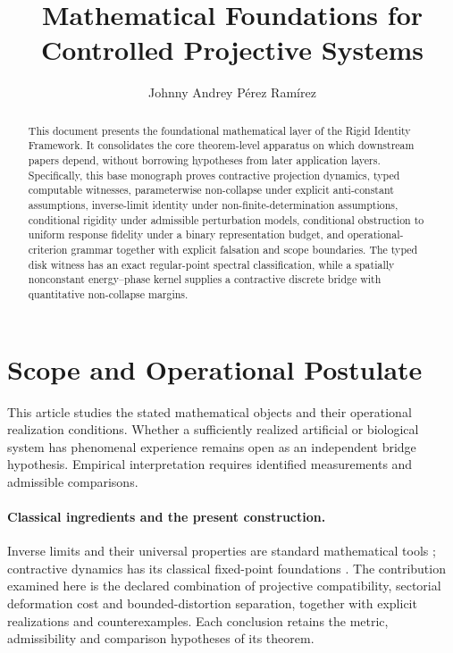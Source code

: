 \documentclass[11pt,a4paper]{article}
\title{\textbf{Mathematical Foundations for Controlled Projective Systems}}
\author{Johnny Andrey P\'{e}rez Ram\'{i}rez}
\date{}
\theoremstyle{plain}
\theoremstyle{definition}
\theoremstyle{remark}
\begin{document}
\setlength{\emergencystretch}{3em}
\maketitle

\begin{abstract}
This document presents the foundational mathematical layer of the Rigid Identity Framework. It consolidates the core theorem-level apparatus on which downstream papers depend, without borrowing hypotheses from later application layers. Specifically, this base monograph proves contractive projection dynamics, typed computable witnesses, parameterwise non-collapse under explicit anti-constant assumptions, inverse-limit identity under non-finite-determination assumptions, conditional rigidity under admissible perturbation models, conditional obstruction to uniform response fidelity under a binary representation budget, and operational-criterion grammar together with explicit falsation and scope boundaries. The typed disk witness has an exact regular-point spectral classification, while a spatially nonconstant energy--phase kernel supplies a contractive discrete bridge with quantitative non-collapse margins.
\end{abstract}

\section*{Scope and Operational Postulate}
This article studies the stated mathematical objects and their operational
realization conditions. Whether a sufficiently realized artificial or biological
system has phenomenal experience remains open as an independent bridge
hypothesis. Empirical interpretation requires identified measurements and
admissible comparisons.


\tableofcontents
\newpage

\paragraph{Classical ingredients and the present construction.}
Inverse limits and their universal properties are standard mathematical
tools \cite{maclane1998,ribes}; contractive dynamics has its classical
fixed-point foundations \cite{banach}. The contribution examined here is
the declared combination of projective compatibility, sectorial deformation
cost and bounded-distortion separation, together with explicit realizations
and counterexamples. Each conclusion retains the metric, admissibility and
comparison hypotheses of its theorem.
\end{document}
